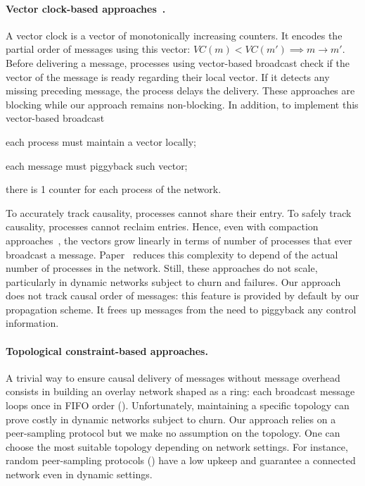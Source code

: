 \paragraph{Vector clock-based
  approaches~\cite{fidge1988timestamps,mattern1989virtual}.} A vector clock is a
vector of monotonically increasing counters.  It encodes the partial order of
messages using this vector: $VC(m) < VC(m') \implies m \rightarrow m'$.  Before
delivering a message, processes using vector-based broadcast check if the vector
of the message is ready regarding their local vector. If it detects any missing
preceding message, the process delays the delivery. These approaches are
blocking while our approach remains non-blocking.  In addition, to implement
this vector-based broadcast
\begin{inparaenum}[(i)]
\item each process must maintain a vector locally;
\item each message must piggyback such vector;
\item there is 1 counter for each process of the network.
\end{inparaenum}
To accurately track causality, processes cannot share their entry. To safely
track causality, processes cannot reclaim entries. Hence, even with compaction
approaches~\cite{singhal1992efficient}, the vectors grow linearly in terms of
number of processes that ever broadcast a
message. Paper~\cite{almeida2008interval} reduces this complexity to depend of
the actual number of processes in the network. Still,
these approaches do not scale, particularly in dynamic networks subject to churn
and failures. Our approach does not track causal order of messages: this feature
is provided by default by our propagation scheme. It frees up messages from the
need to piggyback any control information.




\paragraph{Topological constraint-based approaches.} A trivial way to ensure
causal delivery of messages without message overhead consists in building an
overlay network shaped as a ring: each broadcast message loops once in FIFO
order (\REF). Unfortunately, maintaining a specific topology can prove costly in
dynamic networks subject to churn. Our approach relies on a peer-sampling
protocol but we make no assumption on the topology. One can choose the most
suitable topology depending on network settings. For instance, random
peer-sampling protocols (\REF) have a low upkeep and guarantee a connected
network even in dynamic settings.


